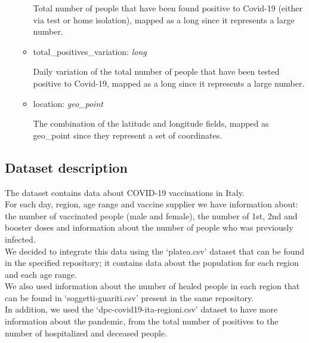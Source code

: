 \documentclass[12pt, a4paper]{article}
\begin{document}
\begin{itemize}
\begin{itemize}
        \begin{footnotesize}
          Total number of people that have been found positive to Covid-19 (either via 
          test or home isolation), mapped as a long since it represents a large number.
        \end{footnotesize} 
      \item total\_positives\_variation: \emph{long} \\
        \begin{footnotesize}
          Daily variation of the total number of people that have been tested positive 
          to Covid-19, mapped as a long since it represents a large number.
        \end{footnotesize}
      \item location: \emph{geo\_point} \\
        \begin{footnotesize}
          The combination of the latitude and longitude fields, mapped as geo\_point 
          since they represent a set of coordinates.
        \end{footnotesize}    
    \end{itemize}
\end{itemize}

\subsection{Dataset description}

The dataset contains data about COVID-19 vaccinations in Italy. \\
For each day, region, age range and vaccine supplier we have information about: the 
number of vaccinated people (male and female), the number of 1st, 2nd and booster doses
and information about the number of people who was previously infected. \\
We decided to integrate this data using the ‘platea.csv’ dataset that can be found 
in the specified repository; it contains data about the population for each region 
and each age range. \\ 
We also used information about the number of healed people in each region that can be 
found in ‘soggetti-guariti.csv’ present in the same repository. \\
In addition, we used the ‘dpc-covid19-ita-regioni.csv’ dataset to have more information 
about the pandemic, from the total number of positives to the number of hospitalized 
and deceased people.

\end{document}
